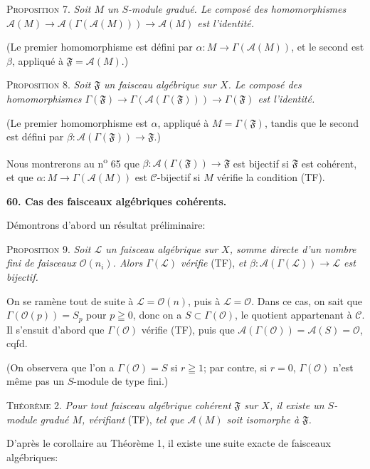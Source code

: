 \textsc{Proposition} 7. \textit{Soit $M$ un $S$-module gradué. Le composé des homomorphismes $\mathcal{A}(M) \to \mathcal{A}(\Gamma(\mathcal{A}(M))) \to \mathcal{A}(M)$ est l'identité.}

(Le premier homomorphisme est défini par $\alpha : M \to \Gamma(\mathcal{A}(M))$, et le second est $\beta$, appliqué à $\mathfrak{F} = \mathcal{A}(M)$.)

\textsc{Proposition} 8. \textit{Soit $\mathfrak{F}$ un faisceau algébrique sur $X$. Le composé des homomorphismes $\Gamma(\mathfrak{F}) \to \Gamma(\mathcal{A}(\Gamma(\mathfrak{F}))) \to \Gamma(\mathfrak{F})$ est l'identité.}

(Le premier homomorphisme est $\alpha$, appliqué à $M = \Gamma(\mathfrak{F})$, tandis que le second est défini par $\beta : \mathcal{A}(\Gamma(\mathfrak{F})) \to \mathfrak{F}$.)

Nous montrerons au n\textsuperscript{o} 65 que $\beta : \mathcal{A}(\Gamma(\mathfrak{F})) \to \mathfrak{F}$ est bijectif si $\mathfrak{F}$ est cohérent, et que $\alpha : M \to \Gamma(\mathcal{A}(M))$ est $\mathcal{C}$-bijectif si $M$ vérifie la condition (TF).


\textbf{60. Cas des faisceaux algébriques cohérents.}

Démontrons d'abord un résultat préliminaire:

\textsc{Proposition} 9. \textit{Soit $\mathcal{L}$ un faisceau algébrique sur $X$, somme directe d'un nombre fini de faisceaux $\mathcal{O}(n_{i})$. Alors $\Gamma(\mathcal{L})$ vérifie} (TF), \textit{et $\beta : \mathcal{A}(\Gamma(\mathcal{L})) \to \mathcal{L}$ est bijectif.}

On se ramène tout de suite à $\mathcal{L} = \mathcal{O}(n)$, puis à $\mathcal{L} = \mathcal{O}$. Dans ce cas, on sait que $\Gamma(\mathcal{O}(p)) = S_{p}$ pour $p \geqq 0$, donc on a $S \subset \Gamma(\mathcal{O})$, le quotient appartenant à $\mathcal{C}$. Il s'ensuit d'abord que $\Gamma(\mathcal{O})$ vérifie (TF), puis que $\mathcal{A}(\Gamma(\mathcal{O})) = \mathcal{A}(S) = \mathcal{O}$, cqfd.

(On observera que l'on a $\Gamma(\mathcal{O}) = S$ si $r \geqq 1$; par contre, si $r = 0$, $\Gamma(\mathcal{O})$ n'est même pas un $S$-module de type fini.)

\textsc{Théorème} 2. \textit{Pour tout faisceau algébrique cohérent $\mathfrak{F}$ sur $X$, il existe un $S$-module gradué $M$, vérifiant} (TF), \textit{tel que $\mathcal{A}(M)$ soit isomorphe à $\mathfrak{F}$.}

D'après le corollaire au Théorème 1, il existe une suite exacte de faisceaux algébriques:

